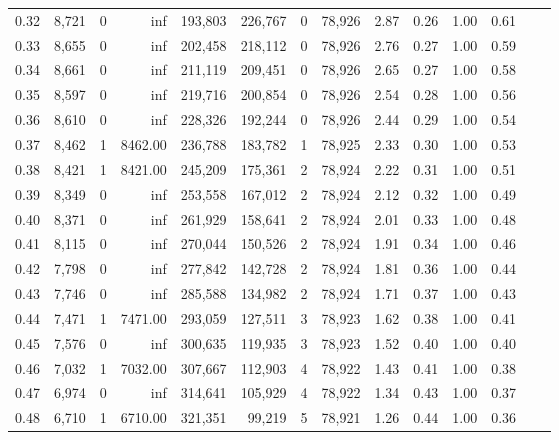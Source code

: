 \begin{tabular}{rrrrrrrrrrrrrr}
0.32 &  8,721 &      0 &      inf &  193,803 &  226,767 &       0 &  78,926 &  2.87 &  0.26 &  1.00 &      0.61 \\
0.33 &  8,655 &      0 &      inf &  202,458 &  218,112 &       0 &  78,926 &  2.76 &  0.27 &  1.00 &      0.59 \\
0.34 &  8,661 &      0 &      inf &  211,119 &  209,451 &       0 &  78,926 &  2.65 &  0.27 &  1.00 &      0.58 \\
0.35 &  8,597 &      0 &      inf &  219,716 &  200,854 &       0 &  78,926 &  2.54 &  0.28 &  1.00 &      0.56 \\
0.36 &  8,610 &      0 &      inf &  228,326 &  192,244 &       0 &  78,926 &  2.44 &  0.29 &  1.00 &      0.54 \\
0.37 &  8,462 &      1 &  8462.00 &  236,788 &  183,782 &       1 &  78,925 &  2.33 &  0.30 &  1.00 &      0.53 \\
0.38 &  8,421 &      1 &  8421.00 &  245,209 &  175,361 &       2 &  78,924 &  2.22 &  0.31 &  1.00 &      0.51 \\
0.39 &  8,349 &      0 &      inf &  253,558 &  167,012 &       2 &  78,924 &  2.12 &  0.32 &  1.00 &      0.49 \\
0.40 &  8,371 &      0 &      inf &  261,929 &  158,641 &       2 &  78,924 &  2.01 &  0.33 &  1.00 &      0.48 \\
0.41 &  8,115 &      0 &      inf &  270,044 &  150,526 &       2 &  78,924 &  1.91 &  0.34 &  1.00 &      0.46 \\
0.42 &  7,798 &      0 &      inf &  277,842 &  142,728 &       2 &  78,924 &  1.81 &  0.36 &  1.00 &      0.44 \\
0.43 &  7,746 &      0 &      inf &  285,588 &  134,982 &       2 &  78,924 &  1.71 &  0.37 &  1.00 &      0.43 \\
0.44 &  7,471 &      1 &  7471.00 &  293,059 &  127,511 &       3 &  78,923 &  1.62 &  0.38 &  1.00 &      0.41 \\
0.45 &  7,576 &      0 &      inf &  300,635 &  119,935 &       3 &  78,923 &  1.52 &  0.40 &  1.00 &      0.40 \\
0.46 &  7,032 &      1 &  7032.00 &  307,667 &  112,903 &       4 &  78,922 &  1.43 &  0.41 &  1.00 &      0.38 \\
0.47 &  6,974 &      0 &      inf &  314,641 &  105,929 &       4 &  78,922 &  1.34 &  0.43 &  1.00 &      0.37 \\
0.48 &  6,710 &      1 &  6710.00 &  321,351 &   99,219 &       5 &  78,921 &  1.26 &  0.44 &  1.00 &      0.36 \\

\end{tabular}

